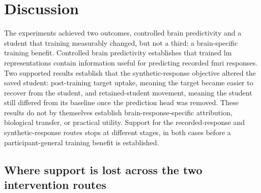 \section{Discussion}
\label{sec:discussion}

The experiments achieved two outcomes, controlled brain predictivity and a student that training measurably changed, but not a third: a brain-specific training benefit.
Controlled brain predictivity establishes that trained \ac{lm} representations contain information useful for predicting recorded \ac{fmri} responses.
Two supported results establish that the synthetic-response objective altered the saved student: post-training target uptake, meaning the target became easier to recover from the student, and retained-student movement, meaning the student still differed from its baseline once the prediction head was removed.
These results do not by themselves establish brain-response-specific attribution, biological transfer, or practical utility.
Support for the recorded-response and synthetic-response routes stops at different stages, in both cases before a participant-general training benefit is established.

\subsection{Where support is lost across the two intervention routes}
\label{sec:discussion-failure}

